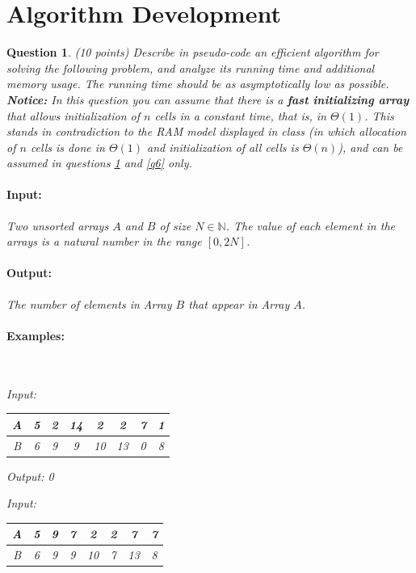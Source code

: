 \documentclass[a4paper]{article}
\theoremstyle{remarksStyle}
\theoremstyle{questionStyle}
\newtheorem{question}{Question}
\theoremstyle{answerStyle}
\begin{document}
\section{Algorithm Development}
\begin{question} (10 points)
\label{q5:a}
Describe in pseudo-code an efficient algorithm for solving the following problem, and analyze its running time and additional memory usage. The running time should be as asymptotically low as possible.
\\
\textbf{Notice:} In this question you can assume that there is a \textbf{fast initializing array} that allows initialization of $n$ cells in a constant time, that is, in $\Theta(1)$.
This stands in contradiction to the RAM model displayed in class (in which allocation of $n$ cells is done in $\Theta(1)$ and initialization of all cells is $\Theta(n)$), and can be assumed in questions \ref{q5:a} and \ref{q6} only.
\paragraph{Input:} Two unsorted arrays $A$ and $B$ of size $N\in \mathbb {N}$. The value of each element in the arrays is a natural number in the range $[0,2N]$.
\paragraph{Output:} The number of elements in Array $B$ that appear in Array $A$. 

\paragraph{Examples:} $ $
\vspace{0.5cm}

Input:
\begin{tabular}{|c || c | c  | c | c | c | c | c ||} 
 \hline
 A & 5 & 2 & 14 & 2 & 2 & 7 & 1  \\ 
 \hline
 B & 6 & 9 & 9 & 10 & 13 & 0 & 8\\
 \hline
\end{tabular}

\vspace{0.5cm}
Output: 0


\vspace{1cm}
Input:
\begin{tabular}{|c || c | c  | c | c | c | c | c ||} 
 \hline
 A & 5 & 9 & 7 & 2 & 2 & 7 & 7  \\ 
 \hline
 B & 6 & 9 & 9 & 10 & 7 & 13 & 8\\
 \hline
\end{tabular}


\end{question}
\end{document}
